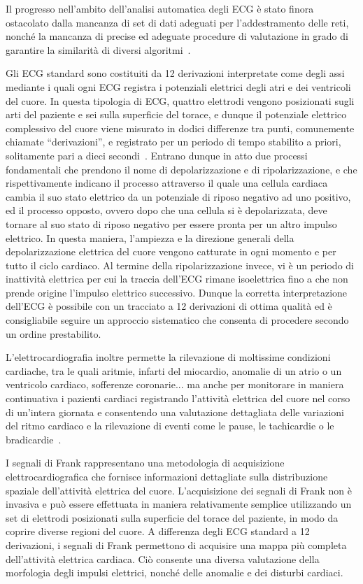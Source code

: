 \documentclass[12pt,italian]{report}
\begin{document}
	Il progresso nell'ambito dell'analisi automatica degli ECG è stato finora ostacolato dalla mancanza di set di dati adeguati per l'addestramento delle reti, nonché la mancanza di precise ed adeguate procedure di valutazione in grado di garantire la similarità di diversi algoritmi~\cite{deeplearning}.
	
	Gli ECG standard sono costituiti da 12 derivazioni interpretate come degli assi mediante i quali ogni ECG registra i potenziali elettrici degli atri e dei ventricoli del cuore. In questa tipologia di ECG, quattro elettrodi vengono posizionati sugli arti del paziente e sei sulla superficie del torace, e dunque il potenziale elettrico complessivo del cuore viene misurato in dodici differenze tra punti, comunemente chiamate ``derivazioni'', e registrato per un periodo di tempo stabilito a priori, solitamente pari a dieci secondi~\cite{ecg}. Entrano dunque in atto due processi fondamentali che prendono il nome di depolarizzazione e di ripolarizzazione, e che rispettivamente indicano il processo attraverso il quale una cellula cardiaca cambia il suo stato elettrico da un potenziale di riposo negativo ad uno positivo, ed il processo opposto, ovvero dopo che una cellula si è depolarizzata, deve tornare al suo stato di riposo negativo per essere pronta per un altro impulso elettrico. In questa maniera, l'ampiezza e la direzione generali della depolarizzazione elettrica del cuore vengono catturate in ogni momento e per tutto il ciclo cardiaco. Al termine della ripolarizzazione invece, vi è un periodo di inattività elettrica per cui la traccia dell'ECG rimane isoelettrica fino a che non prende origine l'impulso elettrico successivo. Dunque la corretta interpretazione dell'ECG è possibile con un tracciato a 12 derivazioni di ottima qualità ed è consigliabile seguire un approccio sistematico che consenta di procedere secondo un ordine prestabilito.
	
	L'elettrocardiografia inoltre permette la rilevazione di moltissime condizioni cardiache, tra le quali aritmie, infarti del miocardio, anomalie di un atrio o un ventricolo cardiaco, sofferenze coronarie... ma anche per monitorare in maniera continuativa i pazienti cardiaci registrando l'attività elettrica del cuore nel corso di un'intera giornata e consentendo una valutazione dettagliata delle variazioni del ritmo cardiaco e la rilevazione di eventi come le pause, le tachicardie o le bradicardie~\cite{classification}.
	
	I segnali di Frank rappresentano una metodologia di acquisizione elettrocardiografica che fornisce informazioni dettagliate sulla distribuzione spaziale dell'attività elettrica del cuore. L'acquisizione dei segnali di Frank non è invasiva e può essere effettuata in maniera relativamente semplice utilizzando un set di elettrodi posizionati sulla superficie del torace del paziente, in modo da coprire diverse regioni del cuore. A differenza degli ECG standard a 12 derivazioni, i segnali di Frank permettono di acquisire una mappa più completa dell'attività elettrica cardiaca. Ciò consente una diversa valutazione della morfologia degli impulsi elettrici, nonché delle anomalie e dei disturbi cardiaci.
	
\end{document}
